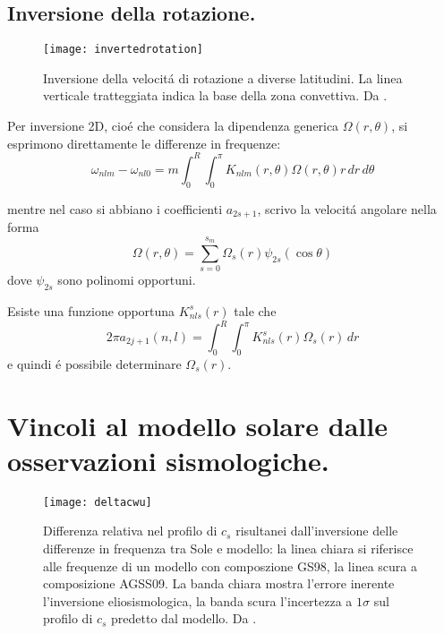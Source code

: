 {\subsection{Inversione della rotazione.}

\begin{figure}[!ht]
\centering
\texttt{[image: invertedrotation]}
\caption{Inversione della velocit\'a di rotazione a diverse latitudini. La linea verticale tratteggiata indica la base della zona convettiva. Da \cite{chr02helioseismology}.}
\end{figure}

Per inversione 2D, cio\'e che considera la dipendenza generica $\Omega(r,\theta)$, si esprimono direttamente le differenze in frequenze:
\begin{equation}
\omega_{nlm}-\omega_{nl0}=m\int_0^R\int_0^{\pi}K_{nlm}(r,\theta)\Omega(r,\theta)r\,dr\,d\theta\label{eq:invrot2D}
\end{equation}

mentre nel caso si abbiano i coefficienti $a_{2s+1}$, scrivo la velocit\'a angolare nella forma
\begin{equation}
\Omega(r,\theta)=\sum_{s=0}^{s_m}\Omega_{s}(r)\psi_{2s}(\cos{\theta})\label{eq:angularv15}
\end{equation}
dove $\psi_{2s}$ sono polinomi opportuni.

Esiste una funzione opportuna $K_{nls}^{s}(r)$ tale che
\begin{equation}
2\pi a_{2j+1}(n,l)=\int_0^R\int_0^{\pi}K_{nls}^{s}(r)\Omega_s(r)\,dr
\end{equation}
e quindi \'e possibile determinare $\Omega_s(r)$.

\section{Vincoli al modello solare dalle osservazioni sismologiche.} %


\begin{figure}[!ht]%
        \texttt{[image: deltacwu]}
        \caption{Differenza relativa nel profilo di $c_s$ risultanei dall'inversione delle differenze in frequenza tra Sole e modello: la linea chiara si riferisce alle frequenze di un modello con composzione GS98, la linea scura a composizione AGSS09. La banda chiara mostra l'errore inerente l'inversione eliosismologica, la banda scura l'incertezza a $1\sigma$ sul profilo di $c_s$ predetto dal modello. Da \cite{villante2014chemical}.}\label{fig:deltacwu}
\end{figure}

}

